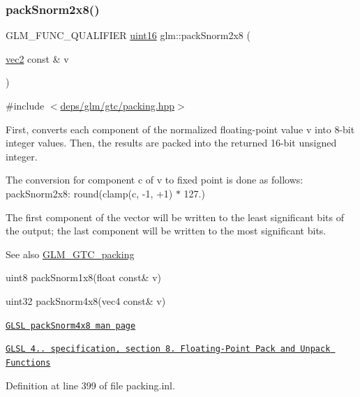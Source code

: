 \subsubsection{\texorpdfstring{pack\+Snorm2x8()}{packSnorm2x8()}}
{\footnotesize\ttfamily G\+L\+M\+\_\+\+F\+U\+N\+C\+\_\+\+Q\+U\+A\+L\+I\+F\+I\+ER \hyperlink{group__gtc__type__precision_gad8c2939e1fdd8e5828b31d95c52255d5}{uint16} glm\+::pack\+Snorm2x8 (\begin{DoxyParamCaption}\item[{\hyperlink{group__core__types_gaa1618f51db67eaa145db101d8c8431d8}{vec2} const \&}]{v }\end{DoxyParamCaption})}



{\ttfamily \#include $<$\hyperlink{gtc_2packing_8hpp}{deps/glm/gtc/packing.\+hpp}$>$}

First, converts each component of the normalized floating-\/point value v into 8-\/bit integer values. Then, the results are packed into the returned 16-\/bit unsigned integer.

The conversion for component c of v to fixed point is done as follows\+: pack\+Snorm2x8\+: round(clamp(c, -\/1, +1) $\ast$ 127.)

The first component of the vector will be written to the least significant bits of the output; the last component will be written to the most significant bits.

\begin{DoxySeeAlso}{See also}
\hyperlink{group__gtc__packing}{G\+L\+M\+\_\+\+G\+T\+C\+\_\+packing} 

uint8 pack\+Snorm1x8(float const\& v) 

uint32 pack\+Snorm4x8(vec4 const\& v) 

\href{http://www.opengl.org/sdk/docs/manglsl/xhtml/packSnorm4x8.xml}{\tt G\+L\+SL pack\+Snorm4x8 man page} 

\href{http://www.opengl.org/registry/doc/GLSLangSpec.4.20.8.pdf}{\tt G\+L\+SL 4.. specification, section 8. Floating-\/\+Point Pack and Unpack Functions} 
\end{DoxySeeAlso}


Definition at line 399 of file packing.\+inl.

\mbox{\label{group__gtc__packing_ga0d4157cec37c0312216a7be1cc92df54}} 
